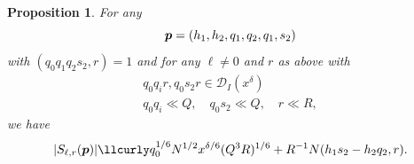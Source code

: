 \documentclass[12pt,a4paper,reqno]{amsart}
\numberwithin{equation}{section}
\theoremstyle{plain}
\newtheorem{proposition}[theorem]{Proposition}
\theoremstyle{definition}
\newcommand\eps{\varepsilon}
\newcommand{\DIone}[2]{\mathcal{D}_{{#1}}({#2})}
\newcommand{\uple}[1]{\text{\boldmath${#1}$}}
\renewcommand{\sim}{\asymp}
\renewcommand{\lessapprox}{\llcurly}
\begin{document}


\begin{proposition}\label{exse-2} 
For any
$$
\uple{p}=(h_1,h_2,q_1,q_2,q_1,s_2)
$$
with $(q_0q_1q_2s_2,r)=1$ and for any $\ell \neq 0$ and $r$ as above
with
\begin{gather*}
  q_0q_ir, q_0s_2r\in \DIone{I}{x^{\delta}}\\
  q_0q_i\ll Q,\quad q_0s_2\ll Q,\quad r\ll R,
\end{gather*}
we have
$$ 
|S_{\ell,r}(\uple{p})| \lessapprox q_0^{1/6} N^{1/2} x^{\delta/6} (Q^3
R)^{1/6} + R^{-1} N (h_1 s_2 - h_2q_2, r).
$$
\end{proposition}
\end{document}
